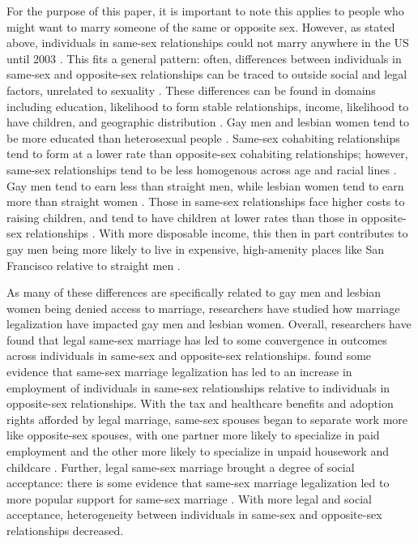 \documentclass[12pt,letterpaper]{article}
\begin{document}
For the purpose of this paper, it is important to note this applies to people who might want to marry someone of the same or opposite sex. However, as stated above, individuals in same-sex relationships could not marry anywhere in the US until 2003 \citep{1, 3, 5, 12}. This fits a general pattern: often, differences between individuals in same-sex and opposite-sex relationships can be traced to outside social and legal factors, unrelated to sexuality \citep{2}. These differences can be found in domains including education, likelihood to form stable relationships, income, likelihood to have children, and geographic distribution \citep{2, 11, 6, 7, 8, 10, 7}. Gay men and lesbian women tend to be more educated than heterosexual people \citep{2, 7, 11}. Same-sex cohabiting relationships tend to form at a lower rate than opposite-sex cohabiting relationships; however, same-sex relationships tend to be less homogenous across age and racial lines \citep{2, 7}. Gay men tend to earn less than straight men, while lesbian women tend to earn more than straight women \citep{6}. Those in same-sex relationships face higher costs to raising children, and tend to have children at lower rates than those in opposite-sex relationships \citep{8, 10, 11}. With more disposable income, this then in part contributes to gay men being more likely to live in expensive, high-amenity places like San Francisco relative to straight men \citep{7, 10, 11, 13}. 

As many of these differences are specifically related to gay men and lesbian women being denied access to marriage, researchers have studied how marriage legalization have impacted gay men and lesbian women. Overall, researchers have found that legal same-sex marriage has led to some convergence in outcomes across individuals in same-sex and opposite-sex relationships. \citet{3} found some evidence that same-sex marriage legalization has led to an increase in employment of individuals in same-sex relationships relative to individuals in opposite-sex relationships. With the tax and healthcare benefits and adoption rights afforded by legal marriage, same-sex spouses began to separate work more like opposite-sex spouses, with one partner more likely to specialize in paid employment and the other more likely to specialize in unpaid housework and childcare \citep{3, 4, 6}. Further, legal same-sex marriage brought a degree of social acceptance: there is some evidence that same-sex marriage legalization led to more popular support for same-sex marriage \citep{3, 21}. With more legal and social acceptance, heterogeneity between individuals in same-sex and opposite-sex relationships decreased.
\end{document}
